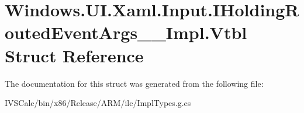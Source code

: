 \hypertarget{struct_windows_1_1_u_i_1_1_xaml_1_1_input_1_1_i_holding_routed_event_args_____impl_1_1_vtbl}{}\section{Windows.\+U\+I.\+Xaml.\+Input.\+I\+Holding\+Routed\+Event\+Args\+\_\+\+\_\+\+Impl.\+Vtbl Struct Reference}
\label{struct_windows_1_1_u_i_1_1_xaml_1_1_input_1_1_i_holding_routed_event_args_____impl_1_1_vtbl}


The documentation for this struct was generated from the following file\+:\begin{DoxyCompactItemize}
\item 
I\+V\+S\+Calc/bin/x86/\+Release/\+A\+R\+M/ilc/Impl\+Types.\+g.\+cs\end{DoxyCompactItemize}

